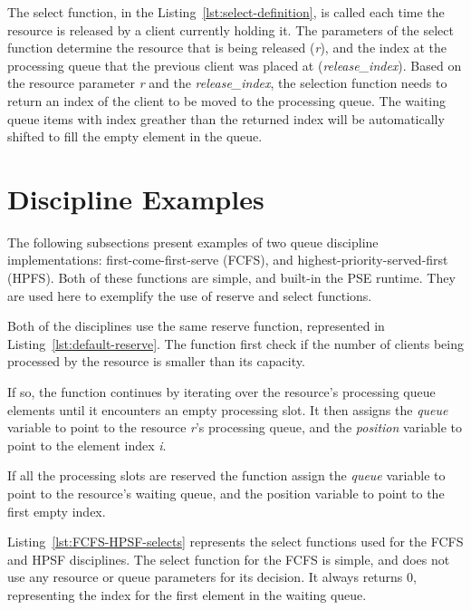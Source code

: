 The select function, in the Listing~\ref{lst:select-definition}, is called each time the resource is released by a client currently holding it. The parameters of the select function determine the resource that is being released (\emph{r}), and the index at the processing queue that the previous client was placed at (\emph{release\_index}). Based on the resource parameter \emph{r} and the \emph{release\_index}, the selection function needs to return an index of the client to be moved to the processing queue. The waiting queue items with index greather than the returned index will be automatically shifted to fill the empty element in the queue.



\section{Discipline Examples}
The following subsections present examples of two queue discipline implementations: first-come-first-serve (FCFS), and highest-priority-served-first (HPFS). Both of these functions are simple, and built-in the PSE runtime. They are used here to exemplify  the use of reserve and select functions.

Both of the disciplines use the same reserve function, represented in Listing~\ref{lst:default-reserve}. The function first check if the number of clients being processed by the resource is smaller than its capacity.

If so, the function continues by iterating over the resource's processing queue elements until it encounters an empty processing slot. It then assigns the \emph{queue} variable to point to the resource \emph{r}'s processing queue, and the \emph{position} variable to point to the element index \emph{i}.

If all the processing slots are reserved the function assign the \emph{queue} variable to point to the resource's waiting queue, and the position variable to point to the first empty index.



Listing~\ref{lst:FCFS-HPSF-selects} represents the select functions used for the FCFS and HPSF disciplines. The select function for the FCFS is simple, and does not use any resource or queue parameters for its decision. It always returns 0, representing the index for the first element in the waiting queue.

